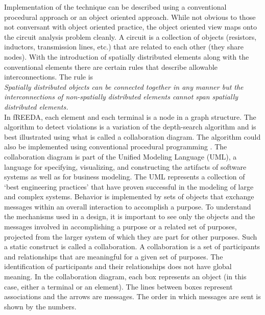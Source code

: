 Implementation of the technique can be described using a conventional
procedural approach or an object oriented approach.  While not obvious
to those not conversant with object oriented practice, the object
oriented view maps onto the circuit analysis problem cleanly.  A
circuit is a collection of objects (resistors, inductors, transmission
lines, etc.) that are related to each other (they share nodes).  With
the introduction of spatially distributed elements along with the
conventional elements there are certain rules that describe allowable
interconnections. The rule is \medskip \\ \emph{Spatially distributed
objects can be connected together in any manner but the
interconnections of non-spatially distributed elements cannot span
spatially distributed elements.} \medskip \\ In fREEDA, each element
and each terminal is a node in a graph structure. The algorithm to
detect violations is a variation of the depth-search algorithm and is
best illustrated using what is called a collaboration diagram. The
algorithm could also be implemented using conventional procedural
programming \cite{cormen:90}. The collaboration diagram \cite{rational}
is part of the Unified Modeling Language (UML), a language for
specifying, visualizing, and constructing the artifacts of software
systems as well as for business modeling. The UML represents a
collection of `best engineering practices' that have proven successful
in the modeling of large and complex systems. Behavior is implemented
by sets of objects that exchange messages within an overall
interaction to accomplish a purpose. To understand the mechanisms used
in a design, it is important to see only the objects and the messages
involved in accomplishing a purpose or a related set of purposes,
projected from the larger system of which they are part for other
purposes. Such a static construct is called a collaboration. A
collaboration is a set of participants and relationships that are
meaningful for a given set of purposes. The identification of
participants and their relationships does not have global meaning. In
the collaboration diagram, each box represents an object (in this
case, either a terminal or an element). The lines between boxes
represent associations and the arrows are messages. The order in which
messages are sent is shown by the numbers.

